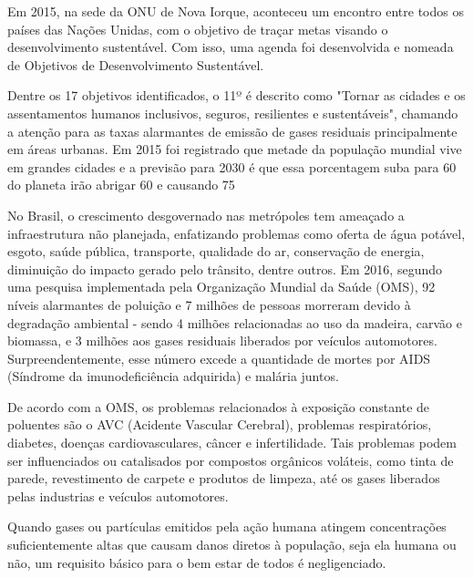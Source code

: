 
Em 2015, na sede da ONU de Nova Iorque, aconteceu um encontro entre todos 
os países das Nações Unidas, com o objetivo de traçar metas visando o 
desenvolvimento sustentável. Com isso, uma agenda foi desenvolvida e nomeada 
de Objetivos de Desenvolvimento Sustentável. 

Dentre os 17 objetivos identificados, o 11º é descrito como "Tornar as cidades 
e os assentamentos humanos inclusivos, seguros, resilientes e sustentáveis", 
chamando a atenção para as taxas alarmantes de emissão de gases residuais 
principalmente em áreas urbanas. Em 2015 foi registrado que metade da população 
mundial vive em grandes cidades e a previsão para 2030 é que essa porcentagem 
suba para 60%
do planeta irão abrigar 60%
e causando 75%

No Brasil, o crescimento desgovernado nas metrópoles tem ameaçado a infraestrutura 
não planejada, enfatizando problemas como oferta de água potável, esgoto, saúde 
pública, transporte, qualidade do ar, conservação de energia, diminuição do impacto 
gerado pelo trânsito, dentre outros. Em 2016, segundo uma pesquisa implementada 
pela Organização Mundial da Saúde (OMS), 92%
níveis alarmantes de poluição e 7  milhões de pessoas morreram devido à degradação 
ambiental - sendo 4 milhões relacionadas ao uso da madeira, carvão e biomassa, e 3 
milhões aos gases residuais liberados por veículos automotores. Surpreendentemente, 
esse número excede a quantidade de mortes por AIDS (Síndrome da imunodeficiência 
adquirida) e malária juntos.

De acordo com a OMS, os problemas relacionados à exposição constante de poluentes são 
o AVC (Acidente Vascular Cerebral), problemas respiratórios, diabetes, doenças 
cardiovasculares, câncer e infertilidade. Tais problemas podem ser influenciados ou 
catalisados por compostos orgânicos voláteis, como tinta de parede, revestimento de 
carpete e produtos de limpeza, até os gases liberados pelas industrias e veículos 
automotores.

Quando gases ou partículas emitidos pela ação humana atingem concentrações 
suficientemente altas que causam danos diretos à população, seja ela humana ou não, 
um requisito básico para o bem estar de todos é negligenciado.

